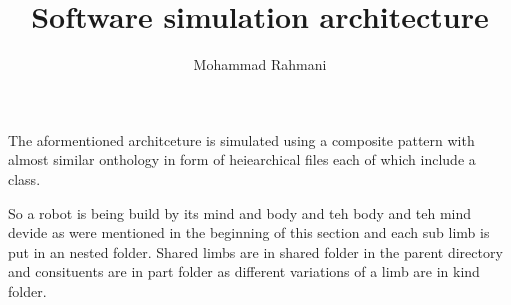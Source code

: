 \documentclass[a4paper]{article}
\title{Software simulation architecture}
\date{}
\author{Mohammad Rahmani}
\begin{document}
   \maketitle

   The aformentioned architceture is simulated using a composite pattern with almost similar onthology in form of heiearchical files each of which include a class. 
   
   So a robot is being build by its mind and body and teh body and teh mind devide as were mentioned in the beginning of this section and each sub limb is put in an nested folder. Shared limbs are in shared folder in the parent directory and consituents are in part folder as different variations of a limb are in kind folder. 
   

   
   
\end{document}
